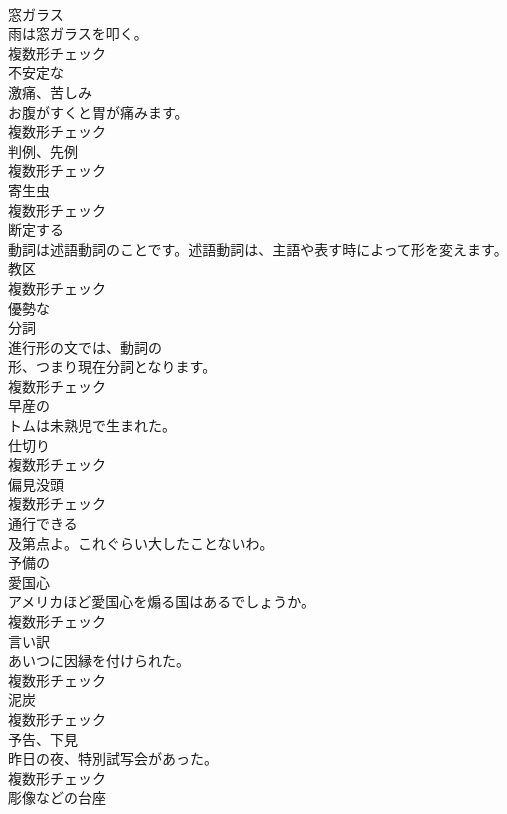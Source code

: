 \documentclass[8pt]{extreport}
\begin{document}
\begin{CJK}{UTF8}{min}
\\	[名詞]	窓ガラス	
\\	雨は窓ガラスを叩く。	
\\	複数形チェック
\\	[形容詞]	不安定な	
\\	[名詞]	激痛、苦しみ	
\\	お腹がすくと胃が痛みます。	
\\	複数形チェック
\\	[名詞]	判例、先例	
\\	複数形チェック
\\	[名詞]	寄生虫	
\\	複数形チェック
\\	[動詞]	断定する	
\\	動詞は述語動詞のことです。述語動詞は、主語や表す時によって形を変えます。	
\\	[名詞]	教区	
\\	複数形チェック
\\	[形容詞]	優勢な	
\\	[名詞]	分詞	
\\	進行形の文では、動詞の
\\	形、つまり現在分詞となります。	
\\	複数形チェック
\\	[形容詞]	早産の	
\\	トムは未熟児で生まれた。	
\\	[名詞]	仕切り	
\\	複数形チェック
\\	[名詞]	偏見没頭	
\\	複数形チェック
\\	[形容詞]	通行できる	
\\	及第点よ。これぐらい大したことないわ。	
\\	[形容詞]	予備の	
\\	[名詞]	愛国心	
\\	アメリカほど愛国心を煽る国はあるでしょうか。	
\\	複数形チェック
\\	[名詞]	言い訳	
\\	あいつに因縁を付けられた。	
\\	複数形チェック
\\	[名詞]	泥炭	
\\	複数形チェック
\\	[名詞]	予告、下見	
\\	昨日の夜、特別試写会があった。	
\\	複数形チェック
\\	[名詞]	彫像などの台座	

\end{CJK}
\end{document}
